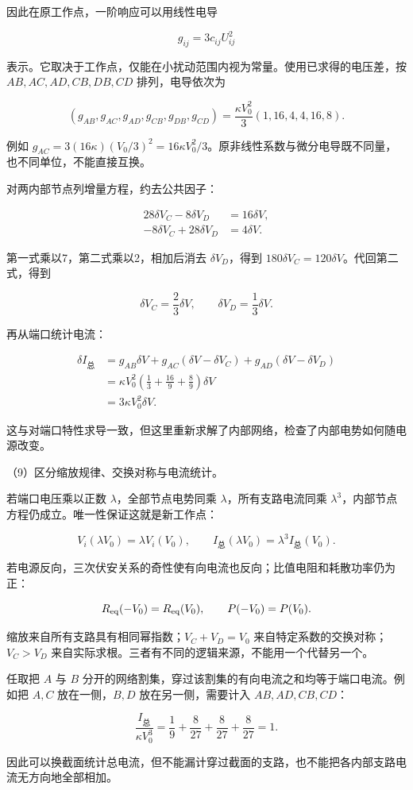 \documentclass[12pt,a4paper,fontset=fandol]{ctexart}
\begin{document}
因此在原工作点，一阶响应可以用线性电导

\[
g_{ij}=3c_{ij}U_{ij}^2
\]

表示。它取决于工作点，仅能在小扰动范围内视为常量。使用已求得的电压差，按
\(AB,AC,AD,CB,DB,CD\) 排列，电导依次为

\[
(g_{AB},g_{AC},g_{AD},g_{CB},g_{DB},g_{CD})
=\frac{\kappa V_0^2}{3}(1,16,4,4,16,8).
\]

例如
\(g_{AC}=3(16\kappa)(V_0/3)^2=16\kappa V_0^2/3\)。原非线性系数与微分电导既不同量，也不同单位，不能直接互换。

对两内部节点列增量方程，约去公共因子：

\[
\begin{aligned}
28\delta V_C-8\delta V_D&=16\delta V,\\
-8\delta V_C+28\delta V_D&=4\delta V.
\end{aligned}
\]

第一式乘以7，第二式乘以2，相加后消去 \(\delta V_D\)，得到
\(180\delta V_C=120\delta V\)。代回第二式，得到

\[
\delta V_C=\frac23\delta V,\qquad
\delta V_D=\frac13\delta V.
\]

再从端口统计电流：

\[
\begin{aligned}
\delta I_{\text{总}}
&=g_{AB}\delta V+g_{AC}(\delta V-\delta V_C)
+g_{AD}(\delta V-\delta V_D)\\
&=\kappa V_0^2\left(\frac13+\frac{16}{9}+\frac89\right)\delta V\\
&=3\kappa V_0^2\delta V.
\end{aligned}
\]

这与对端口特性求导一致，但这里重新求解了内部网络，检查了内部电势如何随电源改变。

\par\noindent\begin{minipage}{\linewidth}
\setlength{\parindent}{2em}\setlength{\parskip}{.35em}
（9）区分缩放规律、交换对称与电流统计。

若端口电压乘以正数 \(\lambda\)，全部节点电势同乘
\(\lambda\)，所有支路电流同乘
\(\lambda^3\)，内部节点方程仍成立。唯一性保证这就是新工作点：

\[
V_i(\lambda V_0)=\lambda V_i(V_0),\qquad
I_{\text{总}}(\lambda V_0)=\lambda^3I_{\text{总}}(V_0).
\]

若电源反向，三次伏安关系的奇性使有向电流也反向；比值电阻和耗散功率仍为正：

\[
R_{\rm eq}(-V_0)=R_{\rm eq}(V_0),\qquad
P(-V_0)=P(V_0).
\]

缩放来自所有支路具有相同幂指数；\(V_C+V_D=V_0\)
来自特定系数的交换对称；\(V_C>V_D\)
来自实际求根。三者有不同的逻辑来源，不能用一个代替另一个。

任取把 \(A\) 与 \(B\)
分开的网络割集，穿过该割集的有向电流之和均等于端口电流。例如把 \(A,C\)
放在一侧，\(B,D\) 放在另一侧，需要计入 \(AB,AD,CB,CD\)：

\[
\frac{I_{\text{总}}}{\kappa V_0^3}
=\frac19+\frac8{27}+\frac8{27}+\frac8{27}=1.
\]

因此可以换截面统计总电流，但不能漏计穿过截面的支路，也不能把各内部支路电流无方向地全部相加。


\end{minipage}\par
\clearpage
\end{document}
